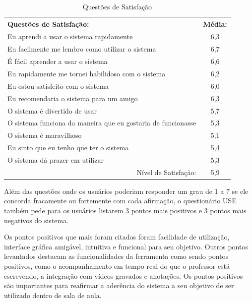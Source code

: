 \begin{table}[]
\centering
\caption{Questões de Satisfação}
\label{tab:use_utilidade}
\begin{tabular}{@{}|l|c|@{}}
\hline
Questões de Satisfação:                                                   & \multicolumn{1}{l|}{Média:} \\ \hline
Eu aprendi a usar o sistema rapidamente                                    & 6,3                         \\ \hline
Eu facilmente me lembro como utilizar o sistema                                  & 6,7                         \\ \hline
É fácil aprender a usar o sistema                                                         & 6,6                            \\ \hline
Eu rapidamente me tornei habilidoso com o sistema                   & 6,2                            \\ \hline
Eu estou satisfeito com o sistema & 6,0                            \\ \hline
Eu recomendaria o sistema para um amigo                                & 6,3                            \\ \hline
O sistema é divertido de usar                       &5,7                             \\ \hline
O sistema funciona da maneira que eu gostaria de funcionasse                       &5,3                             \\ \hline
O sistema é maravilhoso                       &5,1                             \\ \hline
Eu sinto que eu tenho que ter o sistema                       &5,4                             \\ \hline
O sistema dá prazer em utilizar                       &5,3                             \\ \hline
\multicolumn{1}{|r|}{Nível de Satisfação:}                                & 5,9      \\ \hline
\end{tabular}
\end{table}


Além das questões onde os usuários poderiam responder um grau de 1 a 7 se ele concorda fracamente ou fortemente com cada afirmação, o questionário USE também pede para os usuários listarem 3 pontos mais positivos e 3 pontos mais negativos do sistema.

Os pontos positivos que mais foram citados foram facilidade de utilização, interface gráfica amigável, intuitiva e funcional para seu objetivo. Outros pontos levantados destacam as funcionalidades da ferramenta como sendo pontos positivos, como o acompanhamento em tempo real do que o professor está escrevendo, a integração com vídeos gravados e anotações. Os pontos positivos são importantes para reafirmar a aderência do sistema a seu objetivo de ser utilizado dentro de sala de aula. 

